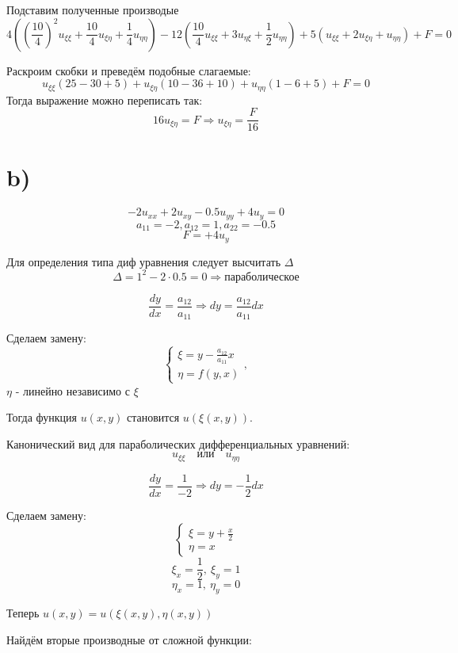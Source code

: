 \documentclass[a4paper,12pt]{article}
\begin{document}
		Подставим полученные производые
	\[
		4\left(			\left(\frac{10}{4}\right)^2 u_{\xi  \xi}+\frac{10}{4}u_{\xi  \eta} + \frac{1}{4}u_{\eta \eta}\right)		 - 12\left(\frac{10}{4}u_{\xi\xi}   +  3u_{\eta\xi} + \frac{1}{2}u_{\eta\eta}\right) + 5\left(u_{\xi\xi}   + 2u_{\xi\eta} + u_{\eta\eta}\right) + F = 0
	\]
	
	Раскроим скобки и преведём подобные слагаемые:
	\[
		u_{\xi\xi}\left(25 - 30 + 5\right) + 
		u_{\xi\eta}\left(10 - 36 + 10\right) + 
		u_{\eta\eta}\left(1 - 6 + 5\right) + F = 0 
	\]
	Тогда выражение можно переписать так:
	\[
		16u_{\xi\eta} = F \Rightarrow u_{\xi\eta} = \frac{F}{16}
	\]
		\section*{b)}
		\[
			-2u_{xx}+2u_{xy} - 0.5u_{yy} + 4u_y = 0
		\]
		\[
			a_{11} = -2, a_{12} = 1, a_{22} = -0.5
		\]
		\[
			F = +4u_y
		\]
		
			Для определения типа диф уравнения следует высчитать $\Delta$
			\[
				\Delta = 1^2 - 2 \cdot 0.5 = 0 \Rightarrow \text{параболическое}
			\]
			
		
		\begin{mdframed}
			\[
			\frac{d y}{d x} = \frac{a_{12}}{a_{11}} \Rightarrow dy = \frac{a_{12}}{a_{11}} dx
			\]
			
			Сделаем замену:
			\[
			\begin{cases}
				\xi = y - \frac{a_{12}}{a_{11}} x \\
				\eta = f(y,x)
			\end{cases},
			\]
			$\eta $ - линейно независимо с $\xi$
			
			Тогда функция \( u(x,y) \) становится \( u(\xi(x,y)) \).
			
			Канонический вид для параболических дифференциальных уравнений:
			\[
			u_{\xi \xi} \quad \text{или} \quad u_{\eta \eta}
			\]
		\end{mdframed}
		
		\[
			\frac{dy}{dx} = \frac{1}{-2} \Rightarrow dy = -\frac{1}{2}dx
		\]
		
		Сделаем замену:
		\[
			\begin{cases}
				\xi = y + \frac{x}{2} \\
				\eta = x
			\end{cases}
		\]
		\[\xi_x = \frac{1}{2}, \ \xi_y = 1\]
		\[\eta_x = 1, \ \eta_y = 0\]
		
		
		Теперь  $u(x,y) = u(\xi(x,y), \eta(x,y))$
		
		Найдём вторые производные от сложной функции:
		
\end{document}
